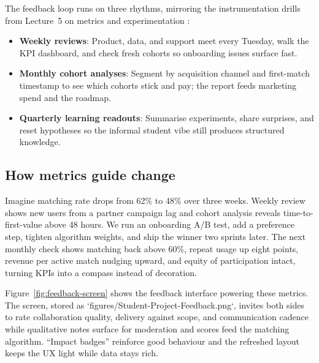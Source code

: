 The feedback loop runs on three rhythms, mirroring the instrumentation drills from Lecture~5 on metrics and experimentation \citep{Lecture05}:
\begin{itemize}
    \item \textbf{Weekly reviews}: Product, data, and support meet every Tuesday, walk the KPI dashboard, and check fresh cohorts so onboarding issues surface fast.
    \item \textbf{Monthly cohort analyses}: Segment by acquisition channel and first-match timestamp to see which cohorts stick and pay; the report feeds marketing spend and the roadmap.
    \item \textbf{Quarterly learning readouts}: Summarise experiments, share surprises, and reset hypotheses so the informal student vibe still produces structured knowledge.
\end{itemize}

\subsection*{How metrics guide change}
Imagine matching rate drops from 62\% to 48\% over three weeks. Weekly review shows new users from a partner campaign lag and cohort analysis reveals time-to-first-value above 48 hours. We run an onboarding A/B test, add a preference step, tighten algorithm weights, and ship the winner two sprints later. The next monthly check shows matching back above 60\%, repeat usage up eight points, revenue per active match nudging upward, and equity of participation intact, turning KPIs into a compass instead of decoration.

Figure~\ref{fig:feedback-screen} shows the feedback interface powering these metrics. The screen, stored as `figures/Student-Project-Feedback.png`, invites both sides to rate collaboration quality, delivery against scope, and communication cadence while qualitative notes surface for moderation and scores feed the matching algorithm. ``Impact badges'' reinforce good behaviour and the refreshed layout keeps the UX light while data stays rich.

